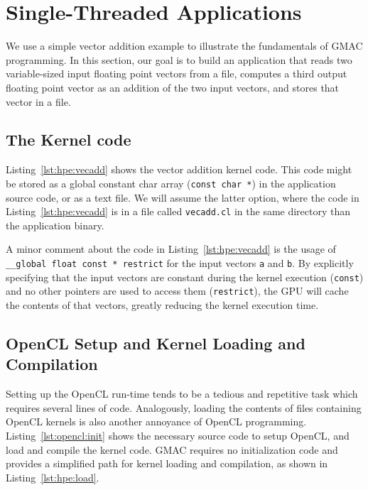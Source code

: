 \section{Single\hyp{}Threaded Applications}

We use a simple vector addition example to illustrate the fundamentals of GMAC programming. In this 
section, our goal is to build an application that reads two variable\hyp{}sized input floating point 
vectors from a file, computes a third output floating point vector as an addition of the two input 
vectors, and stores that vector in a file.

\subsection{The Kernel code}
Listing~\ref{lst:hpe:vecadd} shows the vector addition kernel code. This code might be stored as a 
global constant char array (\ie \texttt{const char *}) in the application source code, or as a text 
file. We will assume the latter option, where the code in Listing~\ref{lst:hpe:vecadd} is in a file 
called \texttt{vecadd.cl} in the same directory than the application binary.



A minor comment about the code in Listing~\ref{lst:hpe:vecadd} is the usage of \texttt{\_\_global 
float const * restrict} for the input  vectors \texttt{a} and \texttt{b}. By explicitly specifying 
that the input vectors are constant during the kernel execution (\ie \texttt{const}) and no other 
pointers are used to access them (\ie \texttt{restrict}), the GPU will cache the contents of that 
vectors, greatly reducing the kernel execution time.

\subsection{OpenCL Setup and Kernel Loading and Compilation}
Setting up the OpenCL run\hyp{}time tends to be a tedious and repetitive task which requires several 
lines of code. Analogously, loading the contents of files containing OpenCL kernels is also another 
annoyance of OpenCL programming. Listing~\ref{lst:opencl:init} shows the necessary source code to 
setup OpenCL, and load and compile the kernel code. GMAC requires no initialization code and 
provides a simplified path for kernel loading and compilation, as shown in 
Listing~\ref{lst:hpe:load}.

